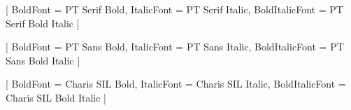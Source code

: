 
\usepackage[a4paper,
            top=16mm, bottom=16mm,
            left=16mm, right=16mm,
            headheight=22pt, headsep=12pt, footskip=18pt]{geometry}

\let\cleardoublepage\clearpage

\usepackage{fontspec}

\setmainfont{PT Serif}[
  BoldFont = PT Serif Bold,
  ItalicFont = PT Serif Italic,
  BoldItalicFont = PT Serif Bold Italic
]

\setsansfont{PT Sans}[
  BoldFont = PT Sans Bold,
  ItalicFont = PT Sans Italic,
  BoldItalicFont = PT Sans Bold Italic
]

\newfontfamily{}[
  BoldFont = Charis SIL Bold,
  ItalicFont = Charis SIL Italic,
  BoldItalicFont = Charis SIL Bold Italic
]

\usepackage{microtype}

\usepackage[dvipsnames]{xcolor}

\usepackage{fancyhdr}
\pagestyle{fancy}
\fancyhf{}
\renewcommand{\headrulewidth}{0.4pt}
\renewcommand{\headrule}{\hbox to\headwidth{\color{bordercol}\leaders\hrule height \headrulewidth\hfill}}

\fancyhead[LE]{\small\sffamily\color{mutedtext}\textbf{\thepage}\quad\textbar\quad\nouppercase{\leftmark}}
\fancyhead[RO]{\small\sffamily\color{mutedtext}\nouppercase{\rightmark}\quad\textbar\quad\textbf{\thepage}}

\fancypagestyle{plain}{
  \fancyhf{}
  \fancyfoot[C]{\small\sffamily\color{mutedtext}\thepage}
  \renewcommand{\headrulewidth}{0pt}
}

